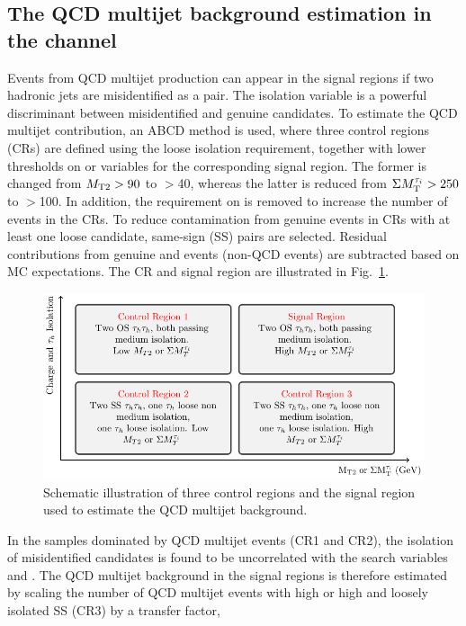 \subsection{\texorpdfstring{The QCD multijet background estimation in the \tauTau channel}{The QCD multijet background estimation in the tau-tau channel}}
\label{sect:bkgQCD}
Events from QCD multijet production can appear in the signal regions if two hadronic jets are misidentified as a \tauTau pair.
The isolation variable is a powerful discriminant between misidentified and genuine \Tau candidates. To estimate the QCD multijet contribution, an ABCD method is used, where three \tauTau control regions (CRs) are defined using the loose \Tau isolation requirement, together with lower thresholds on \mttwo or \SumMT variables for the corresponding signal region. The former is changed from ${M_\mathrm{ T2}} > 90$ to $>$40\GeV, whereas the latter is reduced from $\Sigma M_\mathrm{T}^{\tau_i} > 250$ to $>$100\GeV. In addition, the requirement on \deltaphi is removed to increase the number of events in the CRs.
To reduce contamination from genuine \tauTau events
in CRs with at least one loose \Tau candidate,
same-sign (SS) \tauTau pairs are selected. Residual contributions from genuine
\tauTau and \wjets events (non-QCD events) are subtracted based on MC expectations.
The CR and signal region are illustrated in Fig.~\ref{fig:ABCDQCD}.
\begin{figure}[!htb]
\centering
\includegraphics[angle=0,scale=1.15]{Figure_003.pdf}
\caption{Schematic illustration of three control regions and the signal region used to estimate the QCD multijet background.}
\label{fig:ABCDQCD}
\end{figure}
In the samples dominated by QCD multijet events (CR1 and CR2), the isolation of misidentified \Tau candidates is found 
to be  uncorrelated with the search variables \mttwo and \SumMT.
The QCD multijet background in the signal regions is therefore estimated by scaling the number of QCD multijet events with high \mttwo or high \SumMT and loosely isolated SS \tauTau (CR3) by a transfer factor,
